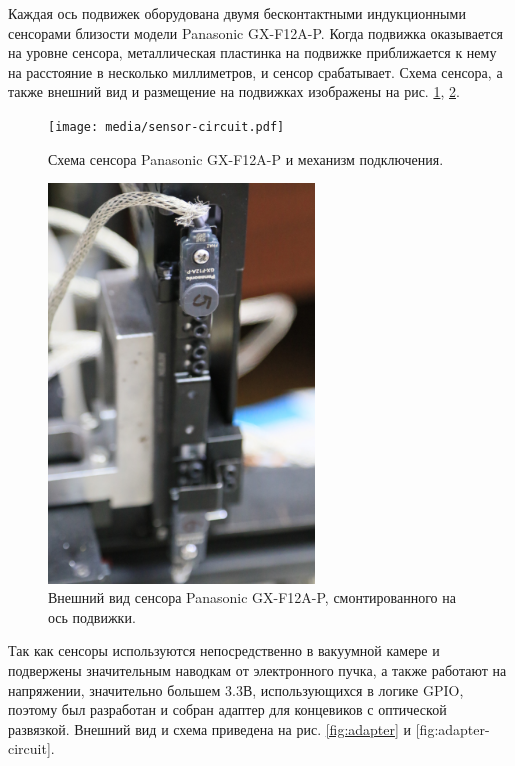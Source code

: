 \documentclass[14pt,russian,a4paper]{extarticle}
\newcounter{subsubsubsection}[subsubsection]
\begin{document}

Каждая ось подвижек оборудована двумя бесконтактными индукционными сенсорами близости модели Panasonic GX-F12A-P. Когда подвижка оказывается на уровне сенсора, металлическая пластинка на подвижке приближается к нему на расстояние в несколько миллиметров, и сенсор срабатывает. Схема сенсора, а также внешний вид и размещение на подвижках изображены на рис. \ref{fig:sensor_circuit}, \ref{fig:sensor_mounted}. 

\begin{figure}[h!]
    \centerline{\texttt{[image: media/sensor-circuit.pdf]}}
    \caption{Схема сенсора Panasonic GX-F12A-P и механизм подключения.}
    \label{fig:sensor_circuit}
\end{figure}

\begin{figure}[h!]
    \centerline{\includegraphics[width=200pt]{media/sensor_mounted.jpg}}
    \caption{Внешний вид сенсора Panasonic GX-F12A-P, смонтированного на ось подвижки.}
    \label{fig:sensor_mounted}
\end{figure}

Так как сенсоры используются непосредственно в вакуумной камере и подвержены значительным наводкам от электронного пучка, а также работают на напряжении, значительно большем 3.3В, использующихся в логике GPIO, поэтому был разработан и собран адаптер для концевиков с оптической развязкой. Внешний вид и схема приведена на рис. \ref{fig:adapter} и [fig:adapter-circuit].
\end{document}
